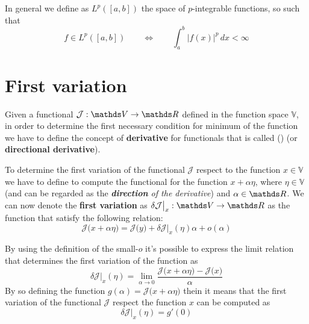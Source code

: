 In general we define as $L^p([a,b])$ the space of $p$-integrable functions, so such that
\[ f\in L^p([a,b])  \qquad \Leftrightarrow \qquad \int_a^b |f(x)|^p\, dx < \infty\]


\section{First variation}

Given a functional $\mathcal J: \mathds V\rightarrow \R$ defined in the function space $\mathds V$, in order to determine the first necessary condition for minimum of the function we have to define the concept of \textbf{derivative} for functionals that is called ()  (or \textbf{directional derivative}).

To determine the first variation of the functional $\mathcal J$ respect to the function $x\in \mathds V$ we have to define to compute the functional for the function $x + \alpha \eta$, where $\eta \in \mathds V$ (and can be regarded as the \textit{\textbf{direction} of the derivative}) and $\alpha \in \R$. We can now denote the \textbf{first variation} as $\delta \mathcal J\big|_x:\mathds V\rightarrow \R$ as the function that satisfy the following relation:
\begin{equation}
	\mathcal J\big(x + \alpha \eta\big) = \mathcal J\big(y\big) + \delta \mathcal J\big|_x(\eta)\alpha +  o(\alpha)
\end{equation}

By using the definition of the small-$o$ it's possible to express the limit relation that determines the first variation of the function as
\begin{equation}
	\delta \mathcal J\big|_x (\eta) = \lim_{\alpha\rightarrow 0} \frac{\mathcal J\big(x + \alpha \eta\big) - \mathcal J\big(x\big)}{\alpha}
\end{equation}
By so defining the function $g(\alpha) = \mathcal J\big(x+ \alpha \eta \big)$	thein it means that the first variation of the functional $\mathcal J$ respect the function $x$ can be computed as
\begin{equation} \label{eq:func:dirderivative}
	\delta \mathcal J\big|_x(\eta) = g'(0)
\end{equation}


